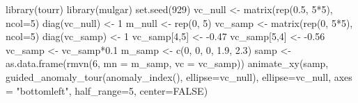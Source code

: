 \documentclass[
  12pt]{article}
\newenvironment{Shaded}{\begin{snugshade}}{\end{snugshade}}
\newcommand{\AttributeTok}[1]{\textcolor[rgb]{0.40,0.45,0.13}{#1}}
\newcommand{\ConstantTok}[1]{\textcolor[rgb]{0.56,0.35,0.01}{#1}}
\newcommand{\DecValTok}[1]{\textcolor[rgb]{0.68,0.00,0.00}{#1}}
\newcommand{\FloatTok}[1]{\textcolor[rgb]{0.68,0.00,0.00}{#1}}
\newcommand{\FunctionTok}[1]{\textcolor[rgb]{0.28,0.35,0.67}{#1}}
\newcommand{\NormalTok}[1]{\textcolor[rgb]{0.00,0.23,0.31}{#1}}
\newcommand{\OtherTok}[1]{\textcolor[rgb]{0.00,0.23,0.31}{#1}}
\newcommand{\SpecialCharTok}[1]{\textcolor[rgb]{0.37,0.37,0.37}{#1}}
\newcommand{\StringTok}[1]{\textcolor[rgb]{0.13,0.47,0.30}{#1}}
\begin{document}
\begin{Shaded}
\begin{Highlighting}[]
\FunctionTok{library}\NormalTok{(tourr)}
\FunctionTok{library}\NormalTok{(mulgar)}
\FunctionTok{set.seed}\NormalTok{(}\DecValTok{929}\NormalTok{)}
\NormalTok{vc\_null }\OtherTok{\textless{}{-}} \FunctionTok{matrix}\NormalTok{(}\FunctionTok{rep}\NormalTok{(}\FloatTok{0.5}\NormalTok{, }\DecValTok{5}\SpecialCharTok{*}\DecValTok{5}\NormalTok{), }\AttributeTok{ncol=}\DecValTok{5}\NormalTok{)}
\FunctionTok{diag}\NormalTok{(vc\_null) }\OtherTok{\textless{}{-}} \DecValTok{1}
\NormalTok{m\_null }\OtherTok{\textless{}{-}} \FunctionTok{rep}\NormalTok{(}\DecValTok{0}\NormalTok{, }\DecValTok{5}\NormalTok{)}
\NormalTok{vc\_samp }\OtherTok{\textless{}{-}} \FunctionTok{matrix}\NormalTok{(}\FunctionTok{rep}\NormalTok{(}\DecValTok{0}\NormalTok{, }\DecValTok{5}\SpecialCharTok{*}\DecValTok{5}\NormalTok{), }\AttributeTok{ncol=}\DecValTok{5}\NormalTok{)}
\FunctionTok{diag}\NormalTok{(vc\_samp) }\OtherTok{\textless{}{-}} \DecValTok{1}
\NormalTok{vc\_samp[}\DecValTok{4}\NormalTok{,}\DecValTok{5}\NormalTok{] }\OtherTok{\textless{}{-}} \SpecialCharTok{{-}}\FloatTok{0.47}
\NormalTok{vc\_samp[}\DecValTok{5}\NormalTok{,}\DecValTok{4}\NormalTok{] }\OtherTok{\textless{}{-}} \SpecialCharTok{{-}}\FloatTok{0.56}
\NormalTok{vc\_samp }\OtherTok{\textless{}{-}}\NormalTok{ vc\_samp}\SpecialCharTok{*}\FloatTok{0.1}
\NormalTok{m\_samp }\OtherTok{\textless{}{-}} \FunctionTok{c}\NormalTok{(}\DecValTok{0}\NormalTok{, }\DecValTok{0}\NormalTok{, }\DecValTok{0}\NormalTok{, }\FloatTok{1.9}\NormalTok{, }\FloatTok{2.3}\NormalTok{)}
\NormalTok{samp }\OtherTok{\textless{}{-}} \FunctionTok{as.data.frame}\NormalTok{(}\FunctionTok{rmvn}\NormalTok{(}\DecValTok{6}\NormalTok{, }
                           \AttributeTok{mn =}\NormalTok{ m\_samp, }
                           \AttributeTok{vc =}\NormalTok{ vc\_samp))}
\FunctionTok{animate\_xy}\NormalTok{(samp, }\FunctionTok{guided\_anomaly\_tour}\NormalTok{(}\FunctionTok{anomaly\_index}\NormalTok{(),}
  \AttributeTok{ellipse=}\NormalTok{vc\_null), }\AttributeTok{ellipse=}\NormalTok{vc\_null, }
  \AttributeTok{axes =} \StringTok{"bottomleft"}\NormalTok{, }\AttributeTok{half\_range=}\DecValTok{5}\NormalTok{, }\AttributeTok{center=}\ConstantTok{FALSE}\NormalTok{)}
\end{Highlighting}
\end{Shaded}
\end{document}
